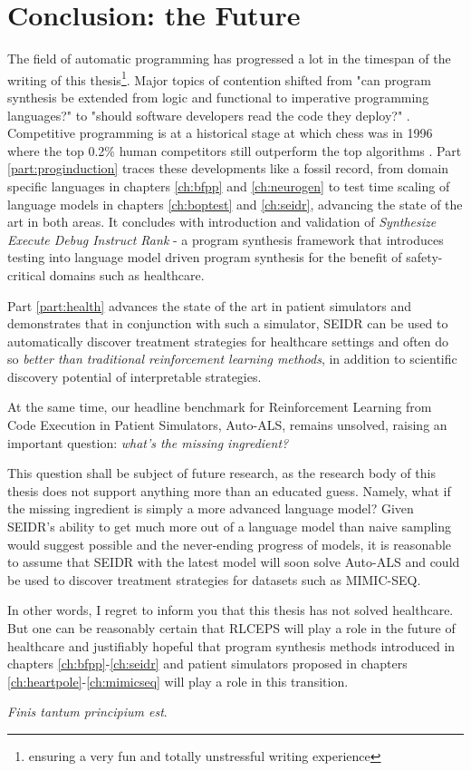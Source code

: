\chapter{Conclusion: the Future}
\label{ch:conclusion}

The field of automatic programming has progressed a lot in the timespan of the writing of this thesis\footnote{ensuring a very fun and totally unstressful writing experience}.
Major topics of contention shifted from "can program synthesis be extended from logic and functional to imperative programming languages?" \cite{polikarpovaStructuringSynthesisHeapmanipulating2019} to "should software developers read the code they deploy?" \cite{andrejkarpathy[@karpathy]TheresNewKind2025}.
Competitive programming is at a historical stage at which chess was in 1996 \cite{pandolfiniKasparovDeepBlue1997} where the top 0.2\% human competitors still outperform the top algorithms \cite{openaiCompetitiveProgrammingLarge2025}.
Part \ref{part:proginduction} traces these developments like a fossil record, from domain specific languages in chapters \ref{ch:bfpp} and \ref{ch:neurogen} to test time scaling of language models in chapters \ref{ch:boptest} and \ref{ch:seidr}, advancing the state of the art in both areas.
It concludes with introduction and validation of \emph{Synthesize Execute Debug Instruct Rank} - a program synthesis framework that introduces testing into language model driven program synthesis for the benefit of safety-critical domains such as healthcare.

Part \ref{part:health} advances the state of the art in patient simulators and demonstrates that in conjunction with such a simulator, SEIDR can be used to automatically discover treatment strategies for healthcare settings and often do so \emph{better than traditional reinforcement learning methods}, in addition to scientific discovery potential of interpretable strategies.

At the same time, our headline benchmark for Reinforcement Learning from Code Execution in Patient Simulators, Auto-ALS, remains unsolved, raising an important question: \emph{what's the missing ingredient?}

This question shall be subject of future research, as the research body of this thesis does not support anything more than an educated guess.
Namely, what if the missing ingredient is simply a more advanced language model?
Given SEIDR's ability to get much more out of a language model than naive sampling would suggest possible and the never-ending progress of models, it is reasonable to assume that SEIDR with the latest model will soon solve Auto-ALS and could be used to discover treatment strategies for datasets such as MIMIC-SEQ.

In other words, I regret to inform you that this thesis has not solved healthcare.
But one can be reasonably certain that RLCEPS will play a role in the future of healthcare and justifiably hopeful that program synthesis methods introduced in chapters \ref{ch:bfpp}-\ref{ch:seidr} and patient simulators proposed in chapters \ref{ch:heartpole}-\ref{ch:mimicseq} will play a role in this transition.

\emph{Finis tantum principium est}.